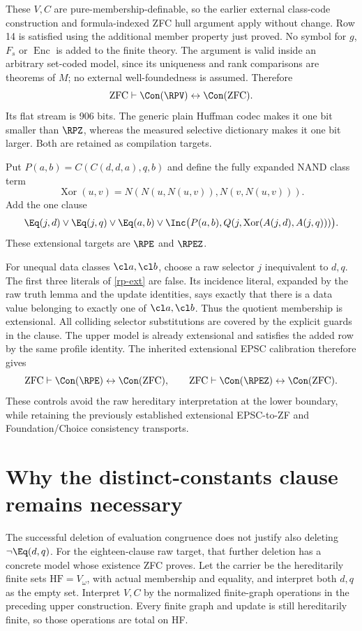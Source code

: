 These $V,C$ are pure-membership-definable, so the earlier external
class-code construction and formula-indexed ZFC hull argument apply
without change. Row 14 is satisfied using the additional member
property just proved. No symbol for $g$, $F_s$ or $\operatorname{Enc}$
is added to the finite theory. The argument is valid inside an arbitrary
set-coded model, since its uniqueness and rank comparisons are theorems
of $M$; no external well-foundedness is assumed. Therefore
\[
 \mathrm{ZFC}\vdash\Con(\RPV)\leftrightarrow\Con(\mathrm{ZFC}).
\]
Its flat stream is 906 bits. The generic plain Huffman codec makes it
one bit smaller than $\RPZ$, whereas the measured selective dictionary
makes it one bit larger. Both are retained as compilation targets.

Put $P(a,b)=C(C(d,d,a),q,b)$ and define the fully expanded NAND class term
\[
 \operatorname{Xor}(u,v)=N(N(u,N(u,v)),N(v,N(u,v))).
\]
Add the one clause
\begin{equation}\label{rp-ext}
 \Eq(j,d)\lor\Eq(j,q)\lor\Eq(a,b)
 \lor\Inc\bigl(P(a,b),Q(j,\operatorname{Xor}(A(j,d),A(j,q)))\bigr).
\end{equation}
These extensional targets are $\RPE$ and $\RPEZ$.

For unequal data classes $\cl a,\cl b$, choose a raw selector $j$
inequivalent to $d,q$. The first three literals of
\eqref{rp-ext} are false. Its incidence literal, expanded by the raw
truth lemma and the update identities, says exactly that there is a
data value belonging to exactly one of $\cl a,\cl b$. Thus the
quotient membership is extensional. All colliding selector substitutions
are covered by the explicit guards in the clause. The upper model is
already extensional and satisfies the added row by the same profile
identity. The inherited extensional EPSC calibration therefore gives
\[
 \mathrm{ZFC}\vdash\Con(\RPE)\leftrightarrow\Con(\mathrm{ZFC}),
 \qquad
 \mathrm{ZFC}\vdash\Con(\RPEZ)\leftrightarrow\Con(\mathrm{ZFC}).
\]
These controls avoid the raw hereditary interpretation at the lower
boundary, while retaining the previously established extensional
EPSC-to-ZF and Foundation/Choice consistency transports.

\section{Why the distinct-constants clause remains necessary}

The successful deletion of evaluation congruence does not justify
also deleting $\neg\Eq(d,q)$. For the eighteen-clause raw target,
that further deletion has a concrete model whose existence ZFC proves.
Let the carrier be the hereditarily finite sets $\mathrm{HF}=V_\omega$,
with actual membership and equality, and interpret both $d,q$ as the
empty set. Interpret $V,C$ by the normalized finite-graph operations
in the preceding upper construction. Every finite graph and update
is still hereditarily finite, so those operations are total on HF.

